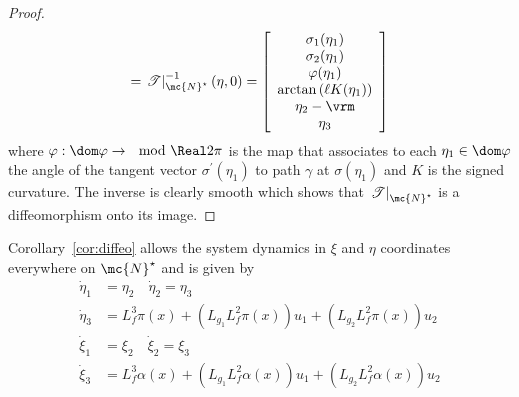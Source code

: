 {\begin{proof}
\[= \left.\mathscr{T}\right|^{-1}_{\mc{N}^\star}(\eta, 0) =
\left[\begin{array}{c}\sigma_1(\eta_1)\\\sigma_2(\eta_1)\\\varphi(\eta_1)\\
    \arctan{\left(\ell K(\eta_1)\right)}\\\eta_2 - \vrm \\\eta_3\end{array}\right]
\]
where $\varphi : \dom\varphi \to \mod{\Real}{2\pi}$ is the map that
associates to each $\eta_1 \in \dom\varphi$ the angle of the tangent
vector $\sigma^\prime(\eta_1)$ to path $\gamma$ at $\sigma(\eta_1)$ and
$K$ is the signed curvature. The inverse
is clearly smooth which shows that $\left.\mathscr{T}\right|_{\mc{N}^\star}$
is a diffeomorphism onto its image.
\end{proof}}
Corollary~\ref{cor:diffeo} allows  the system dynamics in $\xi$ and $\eta$ coordinates everywhere on $\mc{N}^\star$ and is given by
\begin{equation}
\label{eq:dynamic_quadrotor_new_coordinates}
\begin{aligned}
      \dot{\eta}_1 &= \eta_2\quad\dot{\eta}_2 = \eta_3\\
      \dot{\eta}_3 &= L_{f}^{3}\pi(x) +  \left(L_{g_1}L^2_{f}\pi(x)\right) u_1 +  \left(L_{g_2}L^2_{f}\pi(x)\right) u_2\\
      \dot{\xi}_1 &= \xi_2\quad\dot{\xi}_2 = \xi_3\\
      \dot{\xi}_3 &= L_{f}^{3}\alpha(x) +  \left(L_{g_1}L^2_{f}\alpha(x)\right) u_1 +  \left(L_{g_2}L^2_{f}\alpha(x)\right) u_2\\
\end{aligned}
\end{equation}


